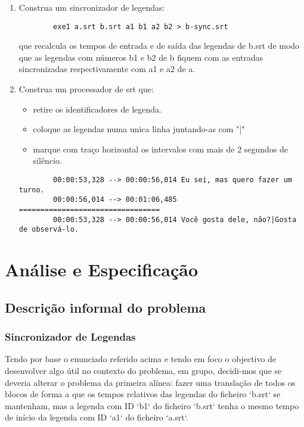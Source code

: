 \documentclass{report}
\begin{document}
\begin{enumerate}[1.]
    \item Construa um sincronizador de legendas:
        \begin{verbatim}
        exe1 a.srt b.srt a1 b1 a2 b2 > b-sync.srt
        \end{verbatim}
        que recalcula os tempos de entrada e de saída das legendas de b.srt de modo que as legendas com números b1 e b2 de b fiquem com as entradas sincronizadas respectivamente com a1 e a2 de a.

    \item Construa um processador de srt que:
        \begin{itemize}
            \item retire os identificadores de legenda.
            \item coloque as legendas numa unica linha juntando-as com "|"
            \item marque com traço horizontal os intervalos com mais de 2 segundos de silêncio.
        \end{itemize}
        \begin{verbatim}
        00:00:53,328 --> 00:00:56,014 Eu sei, mas quero fazer um turno.
        00:00:56,014 --> 00:01:06,485 =================================
        00:00:53,328 --> 00:00:56,014 Você gosta dele, não?|Gosta de observá-lo.
        \end{verbatim}
\end{enumerate}

\chapter{Análise e Especificação} \label{ae}

\section{Descrição informal do problema}

\subsection{Sincronizador de Legendas}

Tendo por base o enunciado referido acima e tendo em foco o objectivo de desenvolver algo útil no contexto do problema, em grupo, decidi-mos que se deveria alterar o problema da primeira alínea:
fazer uma translação de todos os blocos de forma a que os tempos relativos das legendas do ficheiro `b.srt` se mantenham, mas a legenda com ID `b1` do ficheiro `b.srt` tenha o mesmo tempo de início da legenda com ID `a1` do ficheiro `a.srt`.
\end{document}
